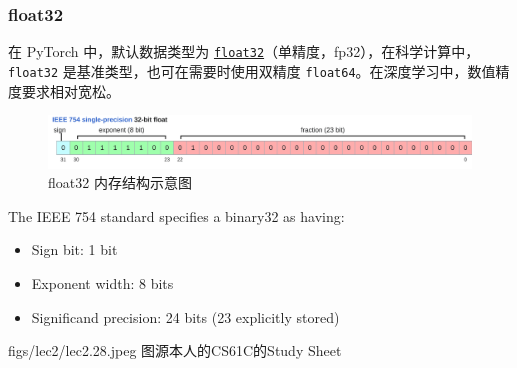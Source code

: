 \subsubsection{float32}
在 PyTorch 中，默认数据类型为 \texttt{\href{https://en.wikipedia.org/wiki/Single-precision_floating-point_format}{float32}}（单精度，fp32），在科学计算中，\texttt{float32} 是基准类型，也可在需要时使用双精度 \texttt{float64}。在深度学习中，数值精度要求相对宽松。




\begin{figure}[htbp]
  \centering
  \includegraphics[width=0.9\linewidth]{figs/lec2/lec2.27.png}
  \caption{float32 内存结构示意图}
  \label{fig:float32 内存结构示意图}
\end{figure}



The IEEE 754 standard specifies a binary32 as having:
\begin{itemize}
    \item Sign bit: 1 bit
    \item Exponent width: 8 bits
    \item Significand precision: 24 bits (23 explicitly stored)
\end{itemize} 

\MarginImageWithNote
  {figs/lec2/lec2.28.jpeg}
  {}
  {图源本人的CS61C的Study Sheet}



